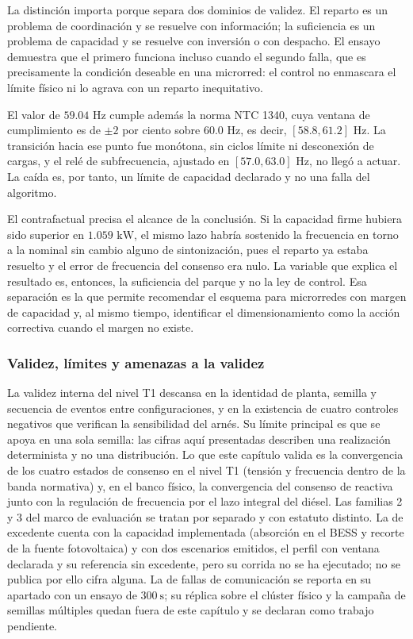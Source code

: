 La distinción importa porque separa dos dominios de validez. El reparto es un problema de coordinación y se resuelve con información; la suficiencia es un problema de capacidad y se resuelve con inversión o con despacho. El ensayo demuestra que el primero funciona incluso cuando el segundo falla, que es precisamente la condición deseable en una microrred: el control no enmascara el límite físico ni lo agrava con un reparto inequitativo.

El valor de $59.04\text{ Hz}$ cumple además la norma NTC 1340, cuya ventana de cumplimiento es de $\pm 2$ por ciento sobre $60.0\text{ Hz}$, es decir, $[58.8, 61.2]\text{ Hz}$. La transición hacia ese punto fue monótona, sin ciclos límite ni desconexión de cargas, y el relé de subfrecuencia, ajustado en $[57.0, 63.0]\text{ Hz}$, no llegó a actuar. La caída es, por tanto, un límite de capacidad declarado y no una falla del algoritmo.

El contrafactual precisa el alcance de la conclusión. Si la capacidad firme hubiera sido superior en $1.059\text{ kW}$, el mismo lazo habría sostenido la frecuencia en torno a la nominal sin cambio alguno de sintonización, pues el reparto ya estaba resuelto y el error de frecuencia del consenso era nulo. La variable que explica el resultado es, entonces, la suficiencia del parque y no la ley de control. Esa separación es la que permite recomendar el esquema para microrredes con margen de capacidad y, al mismo tiempo, identificar el dimensionamiento como la acción correctiva cuando el margen no existe.

\subsubsection{Validez, límites y amenazas a la validez}

La validez interna del nivel T1 descansa en la identidad de planta, semilla y secuencia de eventos entre configuraciones, y en la existencia de cuatro controles negativos que verifican la sensibilidad del arnés. Su límite principal es que se apoya en una sola semilla: las cifras aquí presentadas describen una realización determinista y no una distribución. Lo que este capítulo valida es la convergencia de los cuatro estados de consenso en el nivel T1 (tensión y frecuencia dentro de la banda normativa) y, en el banco físico, la convergencia del consenso de reactiva junto con la regulación de frecuencia por el lazo integral del diésel. Las familias 2 y 3 del marco de evaluación se tratan por separado y con estatuto distinto. La de excedente cuenta con la capacidad implementada (absorción en el BESS y recorte de la fuente fotovoltaica) y con dos escenarios emitidos, el perfil con ventana declarada y su referencia sin excedente, pero su corrida no se ha ejecutado; no se publica por ello cifra alguna. La de fallas de comunicación se reporta en su apartado con un ensayo de $300\ \text{s}$; su réplica sobre el clúster físico y la campaña de semillas múltiples quedan fuera de este capítulo y se declaran como trabajo pendiente.


